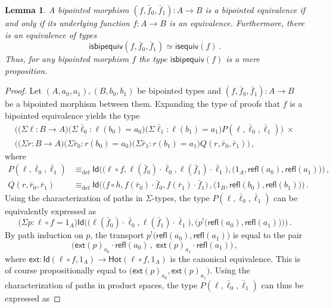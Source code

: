\documentclass[reqno,10pt,a4paper,oneside]{amsart}
\numberwithin{equation}{section}
\theoremstyle{mythm}
\newtheorem{lemma}[theorem]{Lemma}
\theoremstyle{mydef}
\theoremstyle{myrmk}
\newcommand{\deq}{\equiv}
\newcommand{\defeq}{\deq_{\mathrm{def}}}
\newcommand{\co}{\colon}
\newcommand{\comp}{\circ}
\newcommand{\isequiv}{\mathsf{isequiv}}
\newcommand{\ext}{\mathsf{ext}}
\newcommand{\Hot}{\mathsf{Hot}}
\newcommand{\ct}{\cdot}
\newcommand{\Id}{\mathsf{Id}}
\newcommand{\refl}{\mathsf{refl}}
\newcommand{\isbipequiv}{\mathsf{isbipequiv}}
\begin{document}
\begin{lemma}\label{BoolAlgSpace}  \label{thm:usemere}
A bipointed morphism $(f, \bar{f}_0, \bar{f}_1) \co A \to B$ is a bipointed equivalence if and only
if its underlying function $f \co A \to B$ is an equivalence. Furthermore, there is an equivalence of types
\[
\isbipequiv(f, \bar{f}_0, \bar{f}_1)  \simeq \isequiv(f) \, . 
\]
Thus, for any bipointed morphism $f$ the type $\isbipequiv(f)$ is a mere proposition.
\end{lemma}  

\begin{proof}
Let $(A,a_0,a_1), (B,b_0,b_1)$ be bipointed types and $(f, \bar{f}_0, \bar{f}_1) \co A \to B$ be a bipointed morphism between them. Expanding the type of 
proofs that $f$ is a bipointed equivalence yields the type
\begin{multline*}
 \Big(\big(\Sigma \ell \co B \to  A \big) \big(\Sigma \bar{\ell}_0 : \ell(b_0)=a_0 \big) \big(\Sigma \bar{\ell}_1 : \ell(b_1)=a_1\big) P(\ell,\bar{\ell}_0,\bar{\ell}_1)\Big) \; \times \\ 
 \Big(\big(\Sigma r \co B \to A \big) \big(\Sigma \bar{r}_0 : r(b_0)=a_0 \big) \big(\Sigma \bar{r}_1 : r(b_1)=a_1\big) Q(r,\bar{r}_0,\bar{r}_1)   \Big)\, , 
\end{multline*}
where
\begin{align*}
P(\ell,\bar{\ell}_0,\bar{\ell}_1) & \defeq \Id \Big( \big( \ell \comp f, \ell(\bar{f}_0) \ct \bar{\ell}_0, \ell(\bar{f}_1) \ct \bar{\ell}_1\big), \big( 1_A, \refl(a_0), \refl(a_1) \big) \Big)  \, , \\
Q(r,\bar{r}_0,\bar{r}_1) & \defeq \Id \Big( \big( f \comp h,   f(\bar{r}_0) \ct \bar{f}_0, f(\bar{r}_1) \ct \bar{f}_1  \big) \, , \big( 1_B, \refl(b_0), \refl(b_1) \big) \Big) \, .
\end{align*}
Using the characterization of paths in $\Sigma$-types, the type $P(\ell,\bar{\ell}_0,\bar{\ell}_1)$ can be equivalently expressed as
\[
\big(\Sigma p : \ell \comp f = 1_A \big)  \Id \Big(  \big( \ell (\bar{f}_0) \ct \bar{\ell }_0, \ell (\bar{f}_1) \ct \bar{\ell }_1\big), \big( p^{!}\big(\refl(a_0), \refl(a_1) \big) \big) \Big) \, .
\]
By path induction on $p$, the transport $p^{!}\big(\refl(a_0), \refl(a_1) \big)$ is equal to the pair 
\[
\big(  \ext(p)_{a_0} \ct \refl(a_0) \, , \;  \ext(p)_{a_1} \ct \refl(a_1) \big) \, ,
\]
where $\ext : \Id(\ell \comp f, 1_A) \to \Hot(\ell \comp f,  1_A)$ is the canonical equivalence. This is of course propositionally equal to $\big(\ext(p)_{a_0}, \ext(p)_{a_1} \big)$. Using the characterization of paths in product spaces, the type $P(\ell,\bar{\ell}_0,\bar{\ell}_1)$ can thus be expressed as

\end{proof}
\end{document}
